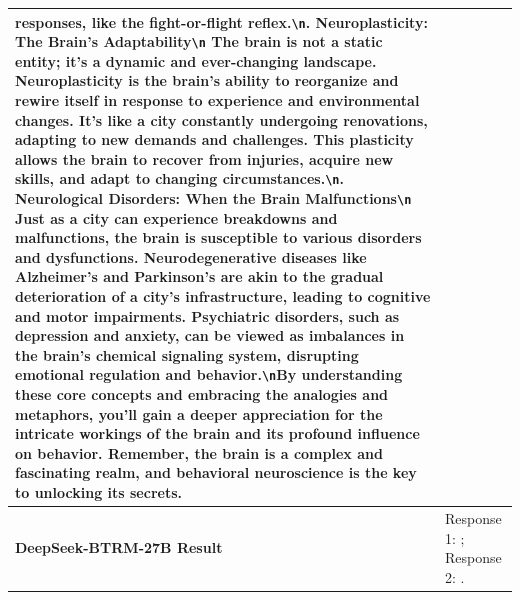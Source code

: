 \documentclass{article} %
\newcommand{\BTRM}{DeepSeek-BTRM\xspace}
\begin{document}
\begin{center}
\begin{longtable}{p{2.8cm}|p{10cm}}
responses, like the fight-or-flight reflex.\verb|\n|\newline 6. Neuroplasticity: The Brain's Adaptability\verb|\n|   The brain is not a static entity; it's a dynamic and ever-changing landscape. Neuroplasticity is the brain's ability to reorganize and rewire itself in response to experience and environmental changes. It's like a city constantly undergoing renovations, adapting to new demands and challenges. This plasticity allows the brain to recover from injuries, acquire new skills, and adapt to changing circumstances.\verb|\n|\newline 7. Neurological Disorders: When the Brain Malfunctions\verb|\n|   Just as a city can experience breakdowns and malfunctions, the brain is susceptible to various disorders and dysfunctions. Neurodegenerative diseases like Alzheimer's and Parkinson's are akin to the gradual deterioration of a city's infrastructure, leading to cognitive and motor impairments. Psychiatric disorders, such as depression and anxiety, can be viewed as imbalances in the brain's chemical signaling system, disrupting emotional regulation and behavior.\verb|\n|\newline By understanding these core concepts and embracing the analogies and metaphors, you'll gain a deeper appreciation for the intricate workings of the brain and its profound influence on behavior. Remember, the brain is a complex and fascinating realm, and behavioral neuroscience is the key to unlocking its secrets.    \\ \midrule
   \textbf{\BTRM-27B Result}   &   Response 1: {\color{red}{0.4665}}; Response 2: {\color{red}{0.3209}}.     \\ \midrule

\end{longtable}
\end{center}
\end{document}
